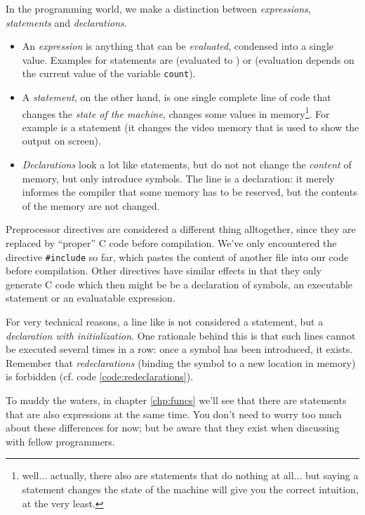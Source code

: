 \begin{hintbox}
In the programming world, we make a distinction between \emph{expressions}, \emph{statements} and \emph{declarations}.

\begin{itemize}
\setlength\itemsep{0pt}
\item An \emph{expression} is anything that can be \emph{evaluated}, \ie condensed into a single value. Examples for statements are  (evaluated to ) 
	or  (evaluation depends on the current value of the variable \texttt{count}).
\item A \emph{statement}, on the other hand, is one single complete line of code that changes the \emph{state of the machine}, \ie changes some values in memory\footnote{well... actually,
	there also are statements that do nothing at all... but saying a statement changes the state of the machine will give you the correct intuition, at the very least.}.
	For example  is a statement (it changes the video memory that is used to show the output on screen).
\item \emph{Declarations} look a lot like statements, but do not not change the \emph{content} of memory, but only introduce symbols.
	The line  is a declaration: it merely informes the compiler that some memory has to be reserved, but the contents of the memory are not changed.
\end{itemize}

Preprocessor directives are considered a different thing alltogether, since they are replaced by \enquote{proper} C code before compilation. We've only encountered the directive \texttt{\#include} so far, which pastes the content of another file into our code before compilation. Other directives have similar effects in that they only generate C code which then might be be a declaration of symbols, an executable statement or an evaluatable expression.

For very technical reasons, a line like  is not considered a statement, but a \emph{declaration with initialization}. One rationale behind this is that such lines cannot be executed several times in a row: once a symbol has been introduced, it exists. Remember that \emph{redeclarations} (\ie binding the symbol to a new location in memory) is forbidden (cf. code \ref{code:redeclarations}).

To muddy the waters, in chapter \ref{chp:funcs} we'll see that there are statements that are also expressions at the same time. You don't need to worry too much about these differences for now; but be aware that they exist when discussing with fellow programmers.
\end{hintbox}

